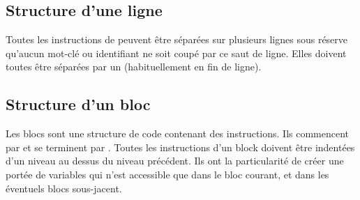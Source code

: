 \documentclass[../userguide.tex]{subfiles}
\begin{document}
    \subsection{Structure d'une ligne} \label{subsec:structure-d'une-ligne}
    \parindent
    Toutes les instructions de \lang{} peuvent être séparées sur plusieurs lignes sous réserve qu'aucun mot-clé ou
    identifiant ne soit coupé par ce saut de ligne.
    Elles doivent toutes être séparées par un \code{;} (habituellement en fin de ligne).

    \subsection{Structure d'un bloc} \label{subsec:structure-d'un-bloc}
    \parindent
    Les blocs sont une structure de code contenant des instructions.
    Ils commencent par \code{\{} et se terminent par \code{\}}.
    Toutes les instructions d'un block doivent être indentées d'un niveau au dessus du niveau précédent.
    Ils ont la particularité de créer une portée de variables qui n'est accessible que dans le bloc courant,
    et dans les éventuels blocs sous-jacent.
\end{document}
